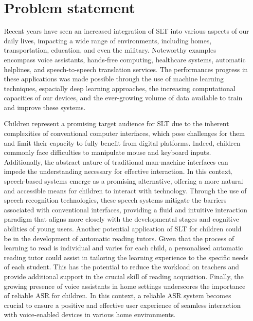 \section{Problem statement}
Recent years have seen an increased integration of \ac{SLT} into various aspects of our daily lives, impacting a wide range of environments, including homes, transportation, education, and even the military. Noteworthy examples encompass voice assistants, hands-free computing, healthcare systems, automatic helplines, and speech-to-speech translation services. The performances progress in these applications was made possible through the use of machine learning techniques, espacially deep learning approaches, the increasing computational capacities of our devices, and the ever-growing volume of data available to train and improve these systems.

Children represent a promising target audience for \ac{SLT} due to the inherent complexities of conventional computer interfaces, which pose challenges for them and limit their capacity to fully benefit from digital platforms. Indeed, children commonly face difficulties to manipulate mouse and keyboard inputs. Additionally, the abstract nature of traditional man-machine interfaces can impede the understanding necessary for effective interaction. In this context, speech-based systems emerge as a promising alternative, offering a more natural and accessible means for children to interact with technology. Through the use of speech recognition technologies, these speech systems mitigate the barriers associated with conventional interfaces, providing a fluid and intuitive interaction paradigm that aligns more closely with the developmental stages and cognitive abilities of young users. Another potential application of \ac{SLT} for children could be in the development of automatic reading tutors. Given that the process of learning to read is individual and varies for each child, a personalised automatic reading tutor could assist in tailoring the learning experience to the specific needs of each student. This has the potential to reduce the workload on teachers and provide additional support in the crucial skill of reading acquisition. Finally, the growing presence of voice assistants in home settings underscores the importance of reliable \ac{ASR} for children. In this context, a reliable ASR system becomes crucial to ensure a positive and effective user experience of seamless interaction with voice-enabled devices in various home environments.

